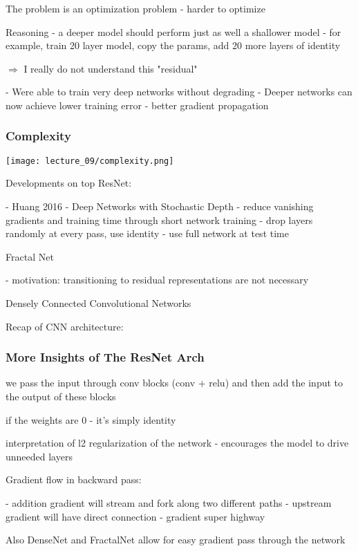 The problem is an optimization problem - harder to optimize

Reasoning - a deeper model should perform just as well a shallower model - for example, train 20 layer model, copy the params, add 20 more layers of identity

$\Rightarrow$ I really do not understand this "residual"

- Were able to train very deep networks without degrading
- Deeper networks can now achieve lower training error - better gradient propagation

\subsubsection{Complexity}

\texttt{[image: lecture\_09/complexity.png]}



Developments on top ResNet: 

- Huang 2016 - Deep Networks with Stochastic Depth
  - reduce vanishing gradients and training time through short network training
  - drop layers randomly at every pass, use identity
  - use full network at test time

Fractal Net

- motivation: transitioning to residual representations are not necessary

Densely Connected Convolutional Networks

Recap of CNN architecture: 

\subsubsection{More Insights of The ResNet Arch}

we pass the input through conv blocks (conv + relu)  and then add the input to the output of these blocks

if the weights are 0 - it's simply identity

interpretation of l2 regularization of the network - encourages the model to drive unneeded layers

Gradient flow in backward pass:

- addition gradient will stream and fork along two different paths
- upstream gradient will have direct connection - gradient super highway

Also DenseNet and FractalNet allow for easy gradient pass through the network



